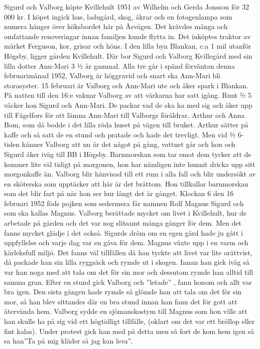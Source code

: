 Sigurd och Valborg köpte Kvillehult 1951 av Wilhelm och Gerda Jonsson för 32 000 kr. I köpet ingick hus, ladugård, skog, åkrar och en fotogenlampa som numera hänger över köksbordet här på Åsvägen. Det krävdes många och omfattande renoveringar innan familjen kunde flytta in. Det inköptes traktor av märket Ferguson, kor, grisar och höns.
I den lilla byn Blankan, c:a 1 mil utanför Högsby, ligger gården Kvillehult. Där bor Sigurd och Valborg Kvillegård med sin lilla dotter Ann-Mari 3 ½ år gammal. Alla tre går i spänd förväntan denna februarimånad 1952, Valborg är höggravid och snart ska Ann-Mari bli storasyster. 15 februari är Valborg och Ann-Mari ute och åker spark i Blankan. På natten till den 16:e vaknar Valborg av att värkarna har satt igång. Runt ½ 5 väcker hon Sigurd och Ann-Mari. De packar vad de ska ha med sig och åker upp till Fågelfors för att lämna Ann-Mari till Valborgs föräldrar, Arthur och Anna Bom, som då bodde i det lilla röda huset på vägen till bruket. Arthur sätter på kaffe och så satt de en stund och pratade och hade det trevligt. Men vid ½ 6-tiden känner Valborg att nu är det något på gång, vattnet går och hon och Sigurd åker iväg till BB i Högsby. Barnmorskan som tar emot dem tycker att de kommer lite väl tidigt på morgonen, hon har nämligen inte hunnit dricka upp sitt morgonkaffe än. Valborg blir hänvisad till ett rum i alla fall och blir undersökt av en sköterska som upptäcker att här är det bråttom. Hon tillkallar barnmorskan som det blir fart på när hon ser hur långt det är gånget. Klockan 6 den 16 februari 1952 föds pojken som sedermera får namnen Rolf Magnus Sigurd och som ska kallas Magnus.
Valborg berättade mycket om livet i Kvillehult, hur de arbetade på gården och det var nog slitsamt många gånger för dem. Men det fanns mycket glädje i det också. Sigurds dröm om en egen gård hade ju gått i uppfyllelse och varje dag var en gåva för dem. Magnus växte upp i en varm och kärleksfull miljö. Det fanns väl tillfällen då han tyckte att livet var lite orättvist, då packade han sin lilla ryggsäck och rymde ut i skogen. Innan han gick iväg så var han noga med att tala om det för sin mor och dessutom rymde han alltid till samma gran. Efter en stund gick Valborg och ”letade” , fann honom och allt var bra igen. Den sista gången hade rymde så glömde han att tala om det för sin mor, så han blev sittandes där en bra stund innan han fann det för gott att återvända hem.
Valborg sydde en sjömanskostym till Magnus som hon ville att han skulle ha på sig vid ett högtidligt tillfälle, (oklart om det var ett bröllop eller fint kalas). Under protest gick han med på detta men så fort de kom hem igen så sa han”Ta på mig kläder så jag kan leva”.
